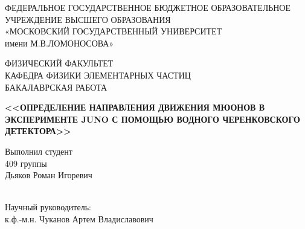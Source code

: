 \documentclass[12pt,a4paper]{report}
\begin{document}
\setlength{\parindent}{1.25cm} 
\sloppy   

\onehalfspacing   

\renewcommand{\cftchapdotsep}{\cftdotsep} 

\thispagestyle{empty}
\begin{titlepage}
\begin{center}
ФЕДЕРАЛЬНОЕ ГОСУДАРСТВЕННОЕ БЮДЖЕТНОЕ ОБРАЗОВАТЕЛЬНОЕ
УЧРЕЖДЕНИЕ ВЫСШЕГО ОБРАЗОВАНИЯ \\
«МОСКОВСКИЙ ГОСУДАРСТВЕННЫЙ УНИВЕРСИТЕТ\\
имени М.В.ЛОМОНОСОВА»
\vspace{1cm}

ФИЗИЧЕСКИЙ ФАКУЛЬТЕТ\\
\vspace{1cm}
КАФЕДРА ФИЗИКИ ЭЛЕМЕНТАРНЫХ ЧАСТИЦ\\

\vspace{1cm}
БАКАЛАВРСКАЯ РАБОТА \\
\vspace{1cm}

\textbf{<<ОПРЕДЕЛЕНИЕ НАПРАВЛЕНИЯ ДВИЖЕНИЯ МЮОНОВ В ЭКСПЕРИМЕНТЕ JUNO С ПОМОЩЬЮ ВОДНОГО ЧЕРЕНКОВСКОГО ДЕТЕКТОРА>>}


\end{center}


\begin{flushright}
\vspace{1cm}

Выполнил студент \\
409 группы\\

Дьяков Роман Игоревич \\

\underline{\hspace{3cm}}\\

\vspace{1cm}

Научный руководитель:\\
к.ф.\--м.н. Чуканов Артем Владиславович \\
\underline{\hspace{3cm}}\\
 

\end{flushright}
\end{titlepage}
\end{document}
